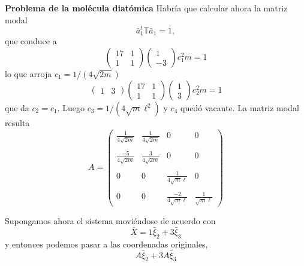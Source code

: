 \documentclass[10pt,oneside]{CBFT_book}
\begin{document}
\begin{ejemplo}{\bf Problema de la molécula diatómica}
Habría que calcular ahora la matriz modal
\[
	\bar{a}_1^t \mathbb{T} \bar{a}_1 = 1,
\]
que conduce a 
\[
	\begin{pmatrix}
	17 & 1 \\
	1  & 1
	\end{pmatrix}
	\begin{pmatrix}
	1 \\
	-3
	\end{pmatrix}
	c_1^2 m = 1
\]
lo que arroja $c_1 = 1 /(4\sqrt{2m})$
\[
	\begin{pmatrix}
	1 & 3 
	\end{pmatrix}
	\begin{pmatrix}
	17 & 1 \\
	1  & 1
	\end{pmatrix}
	\begin{pmatrix}
	1 \\
	3
	\end{pmatrix}
	c_2^2 m = 1
\]
que da $ c_2 = c_1 $. Luego $c_3 = 1 / (4 \sqrt{m} \ell^2 )$ y $c_4$ quedó vacante.
La matriz modal resulta
\[
	A = \begin{pmatrix}
		\frac{1}{4\sqrt{2m}}	&	\frac{1}{4\sqrt{2m}}	&	0	&	0	\\
		\\
		\frac{-5}{4\sqrt{2m}}	&	\frac{3}{4\sqrt{2m}}	&	0	&	0	\\
		\\
		0	&	0	&	\frac{1}{4\sqrt{m}\ell}	&	0	\\
		\\
		0	&	0	&	\frac{-2}{4\sqrt{m}\ell}	&	\frac{1}{\sqrt{m}\ell}
	    \end{pmatrix}
\]

Supongamos ahora el sistema moviéndose de acuerdo con
\[
	\bar{X} = 1 \bar{\xi}_2 + 3 \bar{\xi}_3
\]
y entonces podemos pasar a las coordenadas originales,
\[
	A \bar{\xi}_2 + 3 A \bar{\xi}_3
\]


\end{ejemplo}


\end{document}
